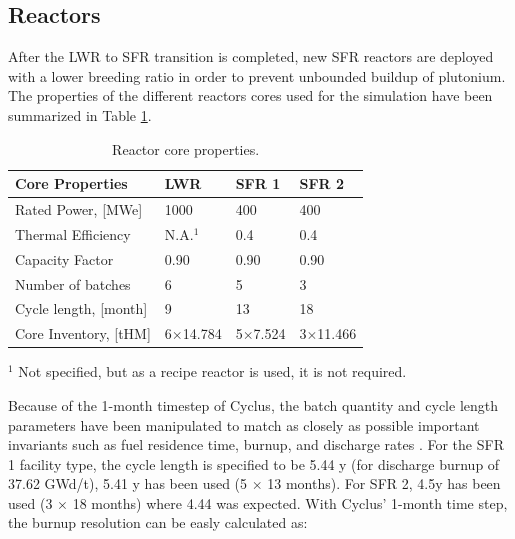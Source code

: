 \documentclass[12pt]{article}
\begin{document}
\subsection{Reactors}

After the LWR to SFR transition is completed, new SFR reactors are deployed
with a lower breeding ratio in order to prevent unbounded buildup of
plutonium. The properties of the different reactors cores used for the
simulation have been summarized in Table \ref{tab:reactor}.


\begin{table}[h!]
    \centering
    \begin{tabularx}{350pt}{lXXX}
    \hline
    Core Properties       &	LWR     &	SFR 1   &	SFR 2     \\
    \hline
    Rated Power, [MWe]    &	1000		&	400     &	400       \\
    Thermal Efficiency    &	N.A.$^1$	&	0.4     &	0.4       \\
    Capacity Factor       &	0.90		&	0.90		&	0.90      \\
    Number of batches     &	6       &	5       &	3         \\
    Cycle length, [month] &	9       &	13      &	18        \\
    Core Inventory, [tHM] &	6$\times$14.784 & 5$\times$7.524 & 3$\times$11.466  \\
    \hline
    \end{tabularx}
    \caption{Reactor core properties.}
    \label{tab:reactor}
    \footnotesize{$^1$ Not specified, but as a recipe reactor is used, it is not required.}
\end{table}




Because of the 1-month timestep of Cyclus, 
the batch quantity and cycle length parameters have been manipulated to match as
closely as possible important invariants such as fuel residence time, burnup,
and discharge rates \cite{B.Feng_calculation}.  For the SFR 1 facility type, the cycle
length is specified to be 5.44 y (for discharge burnup of 37.62 GWd/t), 5.41 y
has been used (5 $\times$ 13 months). For SFR 2, 4.5y has been used (3 $\times$ 18 months)
where 4.44 was expected.  With Cyclus' 1-month time step, the burnup resolution
can be easly calculated as:
\end{document}
